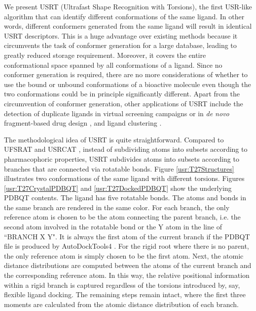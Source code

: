 We present USRT (Ultrafast Shape Recognition with Torsions), the first USR-like algorithm that can identify different conformations of the same ligand. In other words, different conformers generated from the same ligand will result in identical USRT descriptors. This is a huge advantage over existing methods because it circumvents the task of conformer generation for a large database, leading to greatly reduced storage requirement. Moreover, it covers the entire conformational space spanned by all conformations of a ligand. Since no conformer generation is required, there are no more considerations of whether to use the bound or unbound conformations of a bioactive molecule even though the two conformations could be in principle significantly different. Apart from the circumvention of conformer generation, other applications of USRT include the detection of duplicate ligands in virtual screening campaigns \citep{1390} or in \textit{de novo} fragment-based drug design \citep{1409,1387}, and ligand clustering \citep{1280,1332}.

The methodological idea of USRT is quite straightforward. Compared to UFSRAT \citep{1436} and USRCAT \citep{1331}, instead of subdividing atoms into subsets according to pharmacophoric properties, USRT subdivides atoms into subsets according to branches that are connected via rotatable bonds. Figure \ref{usr:T27Structures} illustrates two conformations of the same ligand with different torsions. Figures \ref{usr:T27CrystalPDBQT} and \ref{usr:T27DockedPDBQT} show the underlying PDBQT contents. The ligand has five rotatable bonds. The atoms and bonds in the same branch are rendered in the same color. For each branch, the only reference atom is chosen to be the atom connecting the parent branch, i.e. the second atom involved in the rotatable bond or the Y atom in the line of ``BRANCH X Y". It is always the first atom of the current branch if the PDBQT file is produced by AutoDockTools4 \citep{596}. For the rigid root where there is no parent, the only reference atom is simply chosen to be the first atom. Next, the atomic distance distributions are computed between the atoms of the current branch and the corresponding reference atom. In this way, the relative positional information within a rigid branch is captured regardless of the torsions introduced by, say, flexible ligand docking. The remaining steps remain intact, where the first three moments are calculated from the atomic distance distribution of each branch.

